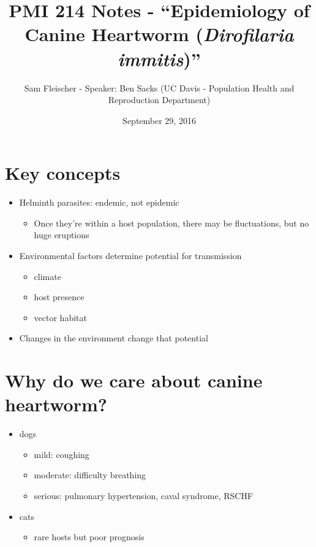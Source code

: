 \documentclass{article}
\title{PMI 214 Notes - ``Epidemiology of Canine Heartworm (\emph{Dirofilaria immitis})''}
\author{Sam Fleischer - Speaker: Ben Sacks (UC Davis - Population Health and Reproduction Department)}
\date{September 29, 2016}
\begin{document}
    \maketitle

    \section{Key concepts}
        \begin{itemize}
            \item Helminth parasites: endemic, not epidemic
            \begin{itemize}
                \item Once they're within a host population, there may be fluctuations, but no huge eruptions
            \end{itemize}
            \item Environmental factors determine potential for transmission
            \begin{itemize}
                \item climate
                \item host presence
                \item vector habitat
            \end{itemize}
            \item Changes in the environment change that potential
        \end{itemize}
    \section{Why do we care about canine heartworm?}
        \begin{itemize}
            \item dogs
            \begin{itemize}
                \item mild: coughing
                \item moderate: difficulty breathing
                \item serious: pulmonary hypertension, caval syndrome, RSCHF
            \end{itemize}
            \item cats
            \begin{itemize}
                \item rare hosts but poor prognosis
            \end{itemize}
        \end{itemize}
\end{document}

